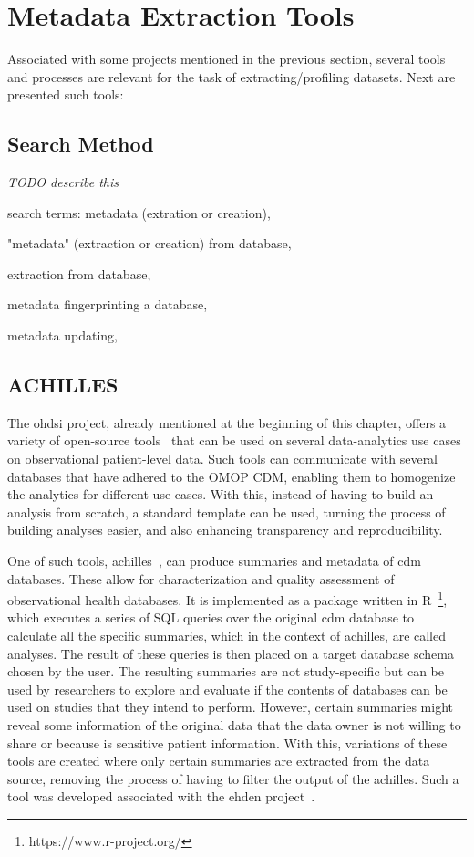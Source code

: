 \section{Metadata Extraction Tools}

Associated with some projects mentioned in the previous section, several tools and
processes are relevant for the task of extracting/profiling datasets.
Next are presented such tools:

\subsection*{Search Method}

\textit{TODO describe this}

search terms: metadata (extration or creation),

"metadata" (extraction or creation) from database,

extraction from database,

metadata fingerprinting a database,

metadata updating,

\subsection*{ACHILLES}
The \gls{ohdsi} project, already mentioned at the beginning of this chapter, offers a variety of open-source tools~\cite{ohdsi-tools} that can be used on several data-analytics use cases on observational patient-level data.
Such tools can communicate with several databases that have adhered to the OMOP CDM, enabling them to homogenize the analytics for different use cases.
With this, instead of having to build an analysis from scratch, a standard template can be used, turning the process of building analyses easier, and also enhancing transparency and reproducibility.

One of such tools, \gls{achilles}~\cite{achilles-github}, can produce summaries and metadata of \gls{cdm} databases.
These allow for characterization and quality assessment of observational health databases.
It is implemented as a package written in R~\footnote{https://www.r-project.org/}, which executes a series of SQL queries over the original \gls{cdm} database to calculate all the specific summaries, which in the context of \gls{achilles}, are called analyses.
The result of these queries is then placed on a target database schema chosen by the user.
The resulting summaries are not study-specific but can be used by researchers to explore and evaluate if the contents of databases can be used on studies that they intend to perform.
However, certain summaries might reveal some information of the original data that the data owner is not willing to share or because is sensitive patient information.
With this, variations of these tools are created where only certain summaries are extracted from the data source, removing the process of having to filter the output of the \gls{achilles}.
Such a tool was developed associated with the \gls{ehden} project~\cite{peters-tool}.

